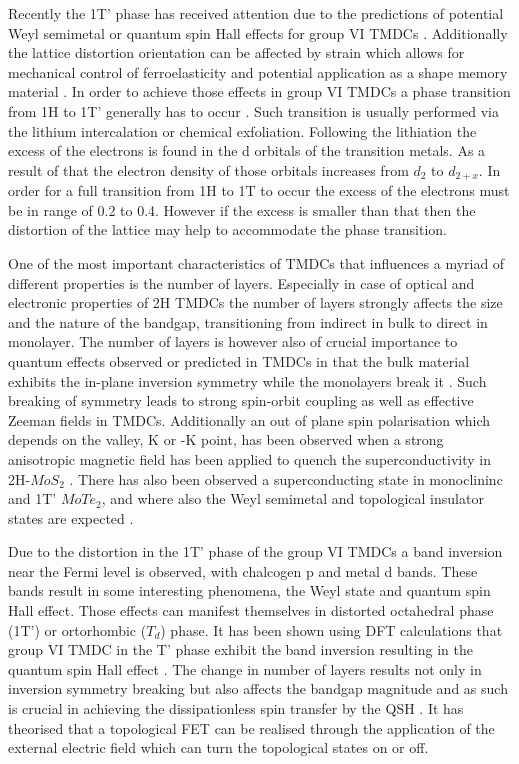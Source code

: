 Recently the 1T' phase has received attention due to the predictions of potential Weyl semimetal or quantum spin Hall effects for group VI TMDCs \cite{Qian2014}\cite{Sun2015}. Additionally the lattice distortion orientation can be affected by strain which allows for mechanical control of ferroelasticity and potential application as a shape memory material \cite{Li2016}. In order to achieve those effects in group VI TMDCs a phase transition from 1H to 1T' generally has to occur \cite{Chhowalla2013}. Such transition is usually performed via the lithium intercalation or chemical exfoliation. Following the lithiation the excess of the electrons is found in the d orbitals of the transition metals. As a result of that the electron density of those orbitals increases from $d_2$ to $d_{2+x}$. In order for a full transition from 1H to 1T to occur the excess of the electrons must be in range of 0.2 to 0.4. However if the excess is smaller than that then the distortion of the lattice may help to accommodate the phase transition.

One of the most important characteristics of TMDCs that influences a myriad of different properties is the number of layers. Especially in case of optical and electronic properties of 2H TMDCs the number of layers strongly affects the size and the nature of the bandgap, transitioning from indirect in bulk to direct in monolayer. The number of layers is however also of crucial importance to quantum effects observed or predicted in TMDCs in that the bulk material exhibits the in-plane inversion symmetry while the monolayers break it \cite{Saito2015}\cite{Lu2015}. Such breaking of symmetry leads to strong spin-orbit coupling as well as effective Zeeman fields in TMDCs. Additionally an out of plane spin polarisation which depends on the valley, K or -K point, has been observed when a strong anisotropic magnetic field has been applied to quench the superconductivity in 2H-$MoS_2$ \cite{Yang2017}. There has also been observed a superconducting state in monoclininc and 1T' $MoTe_2$, and where also the Weyl semimetal and topological insulator states are expected \cite{Qian2014}\cite{Sun2015}\cite{Qi2016}.

Due to the distortion in the 1T' phase of the group VI TMDCs a band inversion near the Fermi level is observed, with chalcogen p and metal d bands. These bands result in some interesting phenomena, the Weyl state and quantum spin Hall effect. Those effects can manifest themselves in distorted octahedral phase (1T') or ortorhombic ($T_d$) phase. It has been shown using DFT calculations that group VI TMDC in the T' phase exhibit the band inversion resulting in the quantum spin Hall effect \cite{Qian2014}\cite{Choe2016}. The change in number of layers results not only in inversion symmetry breaking but also affects the bandgap magnitude and as such is crucial in achieving the dissipationless spin transfer by the QSH \cite{Kane2005}\cite{Konig2007}. It has theorised that a topological FET can be realised through the application of the external electric field which can turn the topological states on or off.

